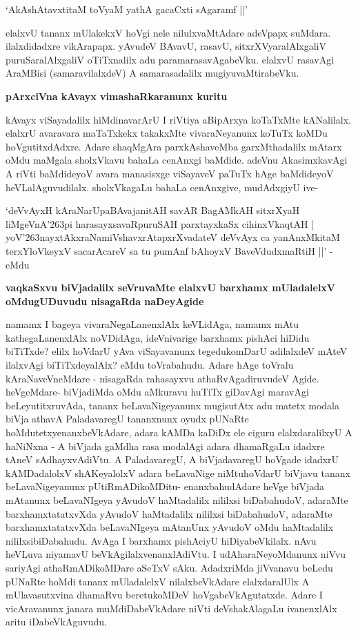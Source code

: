 \begin{shloka}
`AkAshAtavxtitaM toVyaM yathA gacaCxti sAgaramf ||'
\end{shloka}

elalxvU tananx mUlakekxV hoVgi nele nilulxvaMtAdare adeVpapx suMdara. ilalxdidadxre vikArapapx. yAvudeV BAvavU, rasavU, sitxrXVyaralAlxgaliV puruSaralAlxgaliV oTiTxnalilx adu paramarasavAgabeVku. elalxvU rasavAgi AraMBisi (samaravilalxdeV) A samarasadalilx mugiyuvaMtirabeVku.

{\bf pArxciVna kAvayx vimashaRkaranunx kuritu}

kAvayx viSayadalilx hiMdinavarArU I riVtiya aBipArxya koTaTxMte kANalilalx. elalxrU avaravara maTaTxkekx takakxMte vivaraNeyanunx koTuTx koMDu hoVgutitxdAdxre. Adare shaqMgAra parxkAshaveMba garxMthadalilx mAtarx oMdu maMgala sholxVkavu bahaLa cenAnxgi baMdide. adeVnu AkasimxkavAgi A riVti baMdideyoV avara manasisxge viSayaveV paTuTx hAge baMdideyoV heVLalAguvudilalx. sholxVkagaLu bahaLa cenAnxgive, mudAdxgiyU ive-

\begin{shloka}
`deVvAyxH kAraNarUpaBAvajanitAH savAR BagAMkAH sitxrXyaH\\
liMgeVnA\char'263pi harasayxsavaRpuruSAH parxtayxkaSx cihinxVkaqtAH |\\
yoV\char'263nayxtAkxraNamiVshavxrAtapxrXvadateV deVvAyx ca yanAnxMkitaM \\
terxYloVkeyxV sacarAcareV sa tu pumAnf bAhoyxV BaveVdudxmaRtiH ||' - eMdu
\end{shloka}

{\bf vaqkaSxvu biVjadalilx seVruvaMte elalxvU barxhamx mUladalelxV oMdugUDuvudu nisagaRda naDeyAgide}

namamx I bageya vivaraNegaLanenxlAlx keVLidAga, namamx mAtu kathegaLanenxlAlx noVDidAga, ideVnivarige barxhamx pishAci hiDidu biTiTxde? elilx hoVdarU yAva viSayavanunx tegedukomDarU adilalxdeV mAteV ilalxvAgi biTiTxdeyalAlx? eMdu toVrabahudu. Adare hAge toVralu kAraNaveVneMdare - nisagaRda rahasayxvu athaRvAgadiruvudeV Agide. heVgeMdare- biVjadiMda oMdu aMkuravu huTiTx giDavAgi maravAgi beLeyutitxruvAda, tananx beLavaNigeyanunx mugisutAtx adu matetx modala biVja athavA PaladavaregU tananxnunx oyudx pUNaRte hoMdutetxyenanxbeVkAdare, adara kAMDa kaDiDx ele ciguru elalxdaralilxyU A haNiNxna - A biVjada gaMdha rasa modalAgi adara dhamaRgaLu idadxre tAneV sAdhayxvAdiVtu. A PaladavaregU, A biVjadavaregU hoVgade idadxrU kAMDadalolxV shAKeyalolxV adara beLavaNige niMtuhoVdarU biVjavu tananx beLavaNigeyanunx pUtiRmADikoMDitu- enanxbahudAdare heVge biVjada mAtanunx beLavaNIgeya yAvudoV haMtadalilx nililxsi biDabahudoV, adaraMte barxhamxtatatxvXda yAvudoV haMtadalilx nililxsi biDabahudoV, adaraMte barxhamxtatatxvXda beLavaNIgeya mAtanUnx yAvudoV oMdu haMtadalilx nililxsibiDabahudu. AvAga I barxhamx pishAciyU hiDiyabeVkilalx. nAvu heVLuva niyamavU beVkAgilalxvenanxlAdiVtu. I udAharaNeyoMdanunx niVvu sariyAgi athaRmADikoMDare aSeTxV sAku. AdadxriMda jiVvanavu beLedu pUNaRte hoMdi tananx mUladalelxV nilalxbeVkAdare elalxdaralUlx A mUlavasutxvina dhamaRvu beretukoMDeV hoVgabeVkAgutatxde. Adare I vicAravanunx janara muMdiDabeVkAdare niVti deVshakAlagaLu ivanenxlAlx aritu iDabeVkAguvudu.

